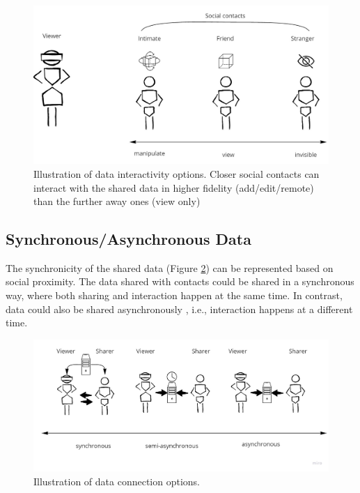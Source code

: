 \begin{figure}[ht]
    \centering
    \includegraphics[width=0.8\linewidth]{images/30-continuum/Continuum-interaction.jpg}
    \caption{Illustration of data interactivity options. Closer social contacts can interact with the shared data in higher fidelity (add/edit/remote) than the further away ones (view only)}
    \label{fig:continuum:data-interaction}
\end{figure}



\subsection{Synchronous/Asynchronous Data}

The synchronicity of the shared data (Figure \ref{fig:continuum:data-connection}) can be represented based on social proximity. The data shared with contacts could be shared in a synchronous way, where both sharing and interaction happen at the same time. In contrast, data could also be shared asynchronously \cite{Smith2016}, i.e., interaction happens at a different time. 

\begin{figure}[ht]
    \centering
    \includegraphics[width=0.8\linewidth]{images/30-continuum/continuum-connection.jpg}
    \caption{Illustration of data connection options.}
    \label{fig:continuum:data-connection}
\end{figure}

